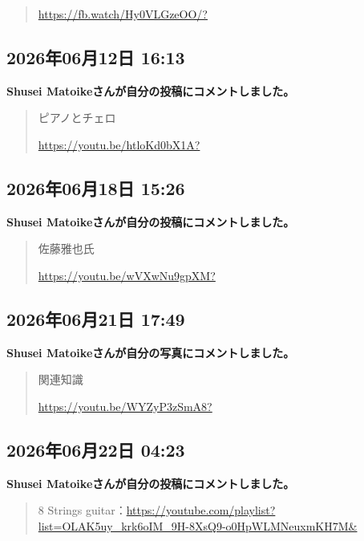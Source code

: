 \begin{quote}
\url{https://fb.watch/Hy0VLGzeOO/?}
\end{quote}

\subsection*{2026年06月12日 16:13}

\textbf{Shusei Matoikeさんが自分の投稿にコメントしました。}

\begin{quote}
ピアノとチェロ

\url{https://youtu.be/htloKd0bX1A?}
\end{quote}

\subsection*{2026年06月18日 15:26}

\textbf{Shusei Matoikeさんが自分の投稿にコメントしました。}

\begin{quote}
佐藤雅也氏

\url{https://youtu.be/wVXwNu9gpXM?}
\end{quote}

\subsection*{2026年06月21日 17:49}

\textbf{Shusei Matoikeさんが自分の写真にコメントしました。}

\begin{quote}
関連知識

\url{https://youtu.be/WYZyP3zSmA8?}
\end{quote}

\subsection*{2026年06月22日 04:23}

\textbf{Shusei Matoikeさんが自分の投稿にコメントしました。}

\begin{quote}
8 Strings guitar：\url{https://youtube.com/playlist?list=OLAK5uy_krk6oIM_9H-8XsQ9-o0HpWLMNeuxmKH7M&}
\end{quote}

